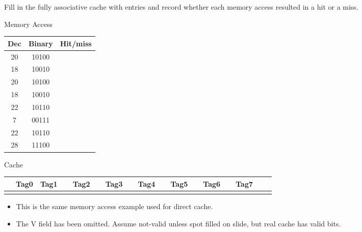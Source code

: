 \begin{frame}[fragile]
\begin{tcolorbox}[enhanced,attach boxed title to top center={yshift=-3mm,yshifttext=-1mm},
  colback=red!5!white,colframe=red!75!black,colbacktitle=red!80!black,
  title=Try this,fonttitle=\bfseries,
  boxed title style={size=small,colframe=red!50!black} ]
  {\footnotesize
  Fill in the fully associative cache with entries and record whether each memory access resulted in a hit or a miss.
\begin{center}
Memory Access

\begin{tabular}{|c|c|c|}
\hline
Dec  & Binary  & Hit/miss \\
\hline
20 & 10100&\\
18 & 10010&\\
\hline
20 & 10100&\\
18 & 10010&\\
\hline
22 & 10110&\\
7 & 00111&\\
\hline
22 & 10110&\\
28 & 11100&\\
\hline
\end{tabular}

\bigskip\bigskip
Cache

\footnotesize
\begin{tabular}{|c|c|c|c|c|c|c|c|c|}
\hline
 ~~Tag0 & Tag1~~ & Tag2~~ & Tag3~~ & Tag4~~ & Tag5~~ & Tag6~~ & Tag7~~\\
\hline
& & & & & & & \\
\hline
\end{tabular}
\end{center}
}
\end{tcolorbox}
\BNotes\ifnum{}
\begin{itemize}
\item This is the same memory access example used for direct cache.
\item The V field has been omitted.  Assume not-valid unless spot filled
	on slide, but real cache has valid bits.
\end{itemize}
\fi\ENotes
\end{frame}

